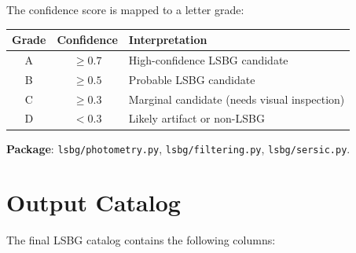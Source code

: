 \documentclass[11pt,fleqn]{book}
\begin{document}
The confidence score is mapped to a letter grade:
\begin{center}
\begin{tabular}{ccl}
\toprule
\textbf{Grade} & \textbf{Confidence} & \textbf{Interpretation} \\
\midrule
A & $\geq 0.7$ & High-confidence LSBG candidate \\
B & $\geq 0.5$ & Probable LSBG candidate \\
C & $\geq 0.3$ & Marginal candidate (needs visual inspection) \\
D & $< 0.3$ & Likely artifact or non-LSBG \\
\bottomrule
\end{tabular}
\end{center}

\textbf{Package}: \texttt{lsbg/photometry.py}, \texttt{lsbg/filtering.py}, \texttt{lsbg/sersic.py}.


\section{Output Catalog}

The final LSBG catalog contains the following columns:
\end{document}

